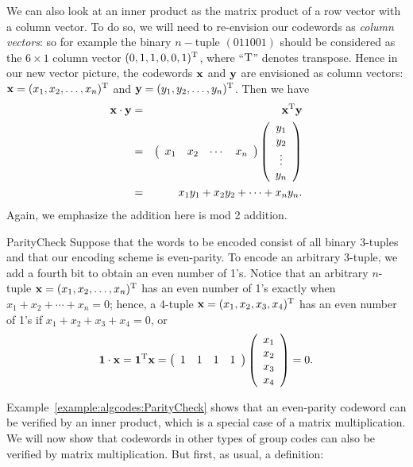 We can also look at an inner product as the matrix product of a row vector with a column vector. To do so, we will need to re-envision our codewords as \emph{column vectors}: so for example the binary $n-$tuple $(011001)$
should be considered as the $6 \times 1$ column vector  $(0,1,1,0,0,1)^{\rm T}$, where ``${\rm T}$'' denotes transpose.
Hence in our new vector picture, the codewords ${\bold x}$ and ${\bold y}$ are envisioned as column vectors:  ${\bold x} = (x_1, x_2, \ldots, x_n)^{\rm T}$ and ${\bold y} = (y_1, y_2, \ldots, y_n)^{\rm T}$. 
Then we have
\begin{eqnarray*}
{\bold x} \cdot {\bold y} & = & {\bold x}^{\rm T}  {\bold y}
\\
& = &
\left(
\begin{array}{cccc}
x_1 & x_2 & \cdots & x_n
\end{array}
\right)
\left(
\begin{array}{c}
y_1 \\
y_2 \\
\vdots \\
y_n
\end{array}
\right) \\
& = &
x_{1}y_{1} + x_{2}y_{2} + \cdots + x_{n}y_{n}.
\end{eqnarray*}
Again, we emphasize the addition here is mod 2 addition. 

\begin{example}{ParityCheck}
Suppose that the words to be encoded consist of all binary
\mbox{3-tuples}
and that our encoding scheme is even-parity. To encode an arbitrary
3-tuple, we add a fourth bit to obtain an even number of 1's. Notice
that an arbitrary $n$-tuple ${\bold x} = (x_1, x_2, \ldots, x_n)^{\rm T}$ has an even number of 1's exactly when $x_1 + x_2 + \cdots + x_n =
0$; hence, a 4-tuple ${\bold x} = (x_1, x_2, x_3, x_4)^{\rm T}$ has an
even number of 1's if $ x_1+ x_2+ x_3+ x_4 = 0$, or 
\[
{\bold 1} \cdot {\bold x} 
= 
{\bold 1}^{\rm T} {\bold x} 
=
\left(
\begin{array}{cccc}
1 & 1 & 1 & 1
\end{array}
\right)
\left(
\begin{array}{c}
x_1 \\
x_2 \\
x_3 \\
x_4
\end{array}
\right) = 0.
\]
\end{example} 
Example~\ref{example:algcodes:ParityCheck} shows that an even-parity codeword can be verified by an inner product, which is a special case of a matrix multiplication. We will now show that codewords in other types of group codes can also be verified by matrix multiplication. But first, as usual, a definition:

